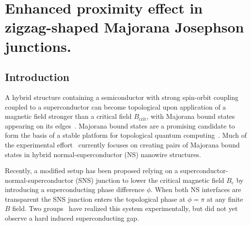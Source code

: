 \chapter[Enhanced proximity effect in zigzag-shaped Majorana JJ]{Enhanced proximity effect in zigzag-shaped Majorana Josephson junctions.}
\label{ch:zigzag}

\newpage
\noindent

\section{Introduction}
A hybrid structure containing a semiconductor with strong spin-orbit coupling coupled to a superconductor can become topological upon application of a magnetic field stronger than a critical field $B_\textrm{crit}$, with Majorana bound states appearing on its edges~\cite{Lutchyn2010,Oreg2010}.
Majorana bound states are a promising candidate to form the basis of a stable platform for topological quantum computing~\cite{Alicea2012,Beenakker2013,Beenakker2016,Leijnse2012}.
Much of the experimental effort~\cite{Mourik2012,Das2012,Deng2012,Churchill2013,Zhang2018} currently focuses on creating pairs of Majorana bound states in hybrid normal-superconductor (NS) nanowire structures.

Recently, a modified setup has been proposed\cite{Pientka2017,Hell2017} relying on a superconductor-normal-superconductor (SNS) junction to lower the critical magnetic field $B_\textrm{c}$ by introducing a superconducting phase difference $\phi$.
When both NS interfaces are transparent the SNS junction enters the topological phase at $\phi=\pi$ at any finite $B$ field.
Two groups~\cite{Fornieri2019,Ren2019} have realized this system experimentally, but did not yet observe a hard induced superconducting gap.

